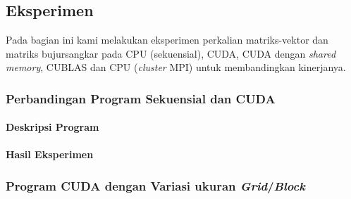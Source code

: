 \chapter{\topikDua}

\section{Eksperimen}
Pada bagian ini kami melakukan eksperimen perkalian matriks-vektor dan matriks bujursangkar pada CPU (sekuensial), CUDA, CUDA dengan \textit{shared memory}, CUBLAS dan CPU (\textit{cluster} MPI) untuk membandingkan kinerjanya.

\subsection{Perbandingan Program Sekuensial dan CUDA} 

\todo{}

\subsubsection{Deskripsi Program}

\todo{}

\subsubsection{Hasil Eksperimen}

\todo{}

%

\subsection{Program CUDA dengan Variasi ukuran \textit{Grid}/\textit{Block}} 

